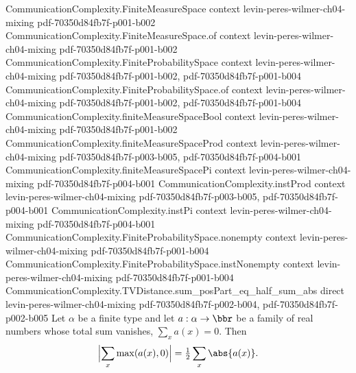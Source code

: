 \begin{lemma}
\label{CommunicationComplexity.TVDistance.abs_sum_pos_indicator_eq_half_sum_abs}
\leanok
{}
\proofstep
  {CommunicationComplexity.FiniteMeasureSpace}
  {context}
  {levin-peres-wilmer-ch04-mixing}
  {pdf-70350d84fb7f-p001-b002}
\proofstep
  {CommunicationComplexity.FiniteMeasureSpace.of}
  {context}
  {levin-peres-wilmer-ch04-mixing}
  {pdf-70350d84fb7f-p001-b002}
\proofstep
  {CommunicationComplexity.FiniteProbabilitySpace}
  {context}
  {levin-peres-wilmer-ch04-mixing}
  {pdf-70350d84fb7f-p001-b002,
    pdf-70350d84fb7f-p001-b004}
\proofstep
  {CommunicationComplexity.FiniteProbabilitySpace.of}
  {context}
  {levin-peres-wilmer-ch04-mixing}
  {pdf-70350d84fb7f-p001-b002,
    pdf-70350d84fb7f-p001-b004}
\proofstep
  {CommunicationComplexity.finiteMeasureSpaceBool}
  {context}
  {levin-peres-wilmer-ch04-mixing}
  {pdf-70350d84fb7f-p001-b002}
\proofstep
  {CommunicationComplexity.finiteMeasureSpaceProd}
  {context}
  {levin-peres-wilmer-ch04-mixing}
  {pdf-70350d84fb7f-p003-b005,
    pdf-70350d84fb7f-p004-b001}
\proofstep
  {CommunicationComplexity.finiteMeasureSpacePi}
  {context}
  {levin-peres-wilmer-ch04-mixing}
  {pdf-70350d84fb7f-p004-b001}
\proofstep
  {CommunicationComplexity.instProd}
  {context}
  {levin-peres-wilmer-ch04-mixing}
  {pdf-70350d84fb7f-p003-b005,
    pdf-70350d84fb7f-p004-b001}
\proofstep
  {CommunicationComplexity.instPi}
  {context}
  {levin-peres-wilmer-ch04-mixing}
  {pdf-70350d84fb7f-p004-b001}
\proofstep
  {CommunicationComplexity.FiniteProbabilitySpace.nonempty}
  {context}
  {levin-peres-wilmer-ch04-mixing}
  {pdf-70350d84fb7f-p001-b004}
\proofstep
  {CommunicationComplexity.FiniteProbabilitySpace.instNonempty}
  {context}
  {levin-peres-wilmer-ch04-mixing}
  {pdf-70350d84fb7f-p001-b004}
\proofstep
  {CommunicationComplexity.TVDistance.sum_posPart_eq_half_sum_abs}
  {direct}
  {levin-peres-wilmer-ch04-mixing}
  {pdf-70350d84fb7f-p002-b004,
    pdf-70350d84fb7f-p002-b005}
Let $\alpha$ be a finite type and let $a : \alpha \to \bbr$ be a family of real numbers
whose total sum vanishes, $\sum_{x} a(x) = 0$. Then
\[
\Bigl|\sum_{x} \max(a(x), 0)\Bigr| = \tfrac{1}{2} \sum_{x} \abs{a(x)}.
\]
\end{lemma}

